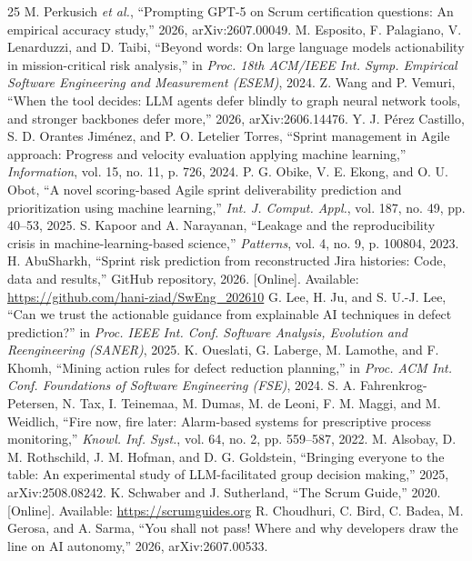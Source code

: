\documentclass[conference]{IEEEtran}
\begin{document}
\begin{thebibliography}{25}
 M. Perkusich \emph{et al.}, ``Prompting GPT-5 on Scrum certification questions: An empirical accuracy study,'' 2026, arXiv:2607.00049.
 M. Esposito, F. Palagiano, V. Lenarduzzi, and D. Taibi, ``Beyond words: On large language models actionability in mission-critical risk analysis,'' in \emph{Proc. 18th ACM/IEEE Int. Symp. Empirical Software Engineering and Measurement (ESEM)}, 2024.
 Z. Wang and P. Vemuri, ``When the tool decides: LLM agents defer blindly to graph neural network tools, and stronger backbones defer more,'' 2026, arXiv:2606.14476.
 Y. J. P\'erez Castillo, S. D. Orantes Jim\'enez, and P. O. Letelier Torres, ``Sprint management in Agile approach: Progress and velocity evaluation applying machine learning,'' \emph{Information}, vol. 15, no. 11, p. 726, 2024.
 P. G. Obike, V. E. Ekong, and O. U. Obot, ``A novel scoring-based Agile sprint deliverability prediction and prioritization using machine learning,'' \emph{Int. J. Comput. Appl.}, vol. 187, no. 49, pp. 40--53, 2025.
 S. Kapoor and A. Narayanan, ``Leakage and the reproducibility crisis in machine-learning-based science,'' \emph{Patterns}, vol. 4, no. 9, p. 100804, 2023.
 H. AbuSharkh, ``Sprint risk prediction from reconstructed Jira histories: Code, data and results,'' GitHub repository, 2026. [Online]. Available: \url{https://github.com/hani-ziad/SwEng_202610}
 G. Lee, H. Ju, and S. U.-J. Lee, ``Can we trust the actionable guidance from explainable AI techniques in defect prediction?'' in \emph{Proc. IEEE Int. Conf. Software Analysis, Evolution and Reengineering (SANER)}, 2025.
 K. Oueslati, G. Laberge, M. Lamothe, and F. Khomh, ``Mining action rules for defect reduction planning,'' in \emph{Proc. ACM Int. Conf. Foundations of Software Engineering (FSE)}, 2024.
 S. A. Fahrenkrog-Petersen, N. Tax, I. Teinemaa, M. Dumas, M. de Leoni, F. M. Maggi, and M. Weidlich, ``Fire now, fire later: Alarm-based systems for prescriptive process monitoring,'' \emph{Knowl. Inf. Syst.}, vol. 64, no. 2, pp. 559--587, 2022.
 M. Alsobay, D. M. Rothschild, J. M. Hofman, and D. G. Goldstein, ``Bringing everyone to the table: An experimental study of LLM-facilitated group decision making,'' 2025, arXiv:2508.08242.
 K. Schwaber and J. Sutherland, ``The Scrum Guide,'' 2020. [Online]. Available: \url{https://scrumguides.org}
 R. Choudhuri, C. Bird, C. Badea, M. Gerosa, and A. Sarma, ``You shall not pass! Where and why developers draw the line on AI autonomy,'' 2026, arXiv:2607.00533.
\end{thebibliography}
\end{document}
